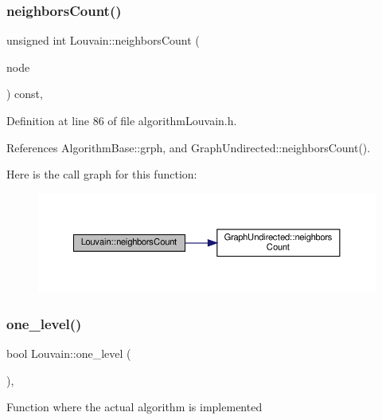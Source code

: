 \subsubsection{\texorpdfstring{neighbors\+Count()}{neighborsCount()}}
{\footnotesize\ttfamily unsigned int Louvain\+::neighbors\+Count (\begin{DoxyParamCaption}\item[{const \hyperlink{edge_8h_a5fbd20c46956d479cb10afc9855223f6}{type\+Vertex} \&}]{node }\end{DoxyParamCaption}) const\hspace{0.3cm}{\ttfamily [inline]}, {\ttfamily [private]}}



Definition at line 86 of file algorithm\+Louvain.\+h.



References Algorithm\+Base\+::grph, and Graph\+Undirected\+::neighbors\+Count().

Here is the call graph for this function\+:
\nopagebreak
\begin{figure}[H]
\begin{center}
\leavevmode
\includegraphics[width=350pt]{classLouvain_a6908d96331a9294d01d88ea97a405508_cgraph}
\end{center}
\end{figure}
\mbox{\label{classLouvain_a89a2206f2669b9c0998d23e87ec40fb8}} 
\subsubsection{\texorpdfstring{one\+\_\+level()}{one\_level()}}
{\footnotesize\ttfamily bool Louvain\+::one\+\_\+level (\begin{DoxyParamCaption}{ }\end{DoxyParamCaption})\hspace{0.3cm}{\ttfamily [inline]}, {\ttfamily [private]}}

Function where the actual algorithm is implemented 

